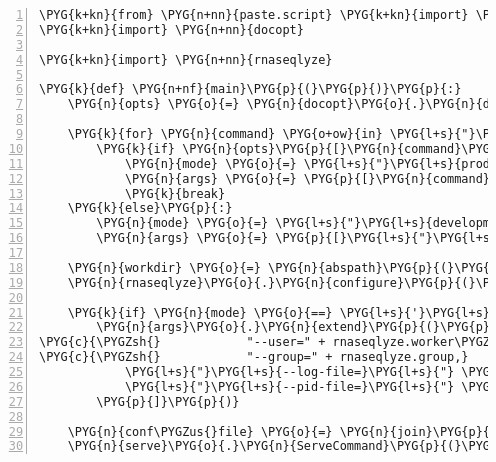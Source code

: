 \begin{Verbatim}[commandchars=\\\{\},numbers=left,firstnumber=1,stepnumber=5]
\PYG{k+kn}{from} \PYG{n+nn}{paste.script} \PYG{k+kn}{import} \PYG{n}{serve}
\PYG{k+kn}{import} \PYG{n+nn}{docopt}

\PYG{k+kn}{import} \PYG{n+nn}{rnaseqlyze}

\PYG{k}{def} \PYG{n+nf}{main}\PYG{p}{(}\PYG{p}{)}\PYG{p}{:}
    \PYG{n}{opts} \PYG{o}{=} \PYG{n}{docopt}\PYG{o}{.}\PYG{n}{docopt}\PYG{p}{(}\PYG{n}{\PYGZus{}\PYGZus{}doc\PYGZus{}\PYGZus{}}\PYG{p}{)}

    \PYG{k}{for} \PYG{n}{command} \PYG{o+ow}{in} \PYG{l+s}{"}\PYG{l+s}{start\textbar{}stop\textbar{}restart}\PYG{l+s}{"}\PYG{o}{.}\PYG{n}{split}\PYG{p}{(}\PYG{l+s}{'}\PYG{l+s}{\textbar{}}\PYG{l+s}{'}\PYG{p}{)}\PYG{p}{:}
        \PYG{k}{if} \PYG{n}{opts}\PYG{p}{[}\PYG{n}{command}\PYG{p}{]}\PYG{p}{:}
            \PYG{n}{mode} \PYG{o}{=} \PYG{l+s}{"}\PYG{l+s}{production}\PYG{l+s}{"}
            \PYG{n}{args} \PYG{o}{=} \PYG{p}{[}\PYG{n}{command}\PYG{p}{,} \PYG{l+s}{"}\PYG{l+s}{--daemon}\PYG{l+s}{"}\PYG{p}{]}
            \PYG{k}{break}
    \PYG{k}{else}\PYG{p}{:}
        \PYG{n}{mode} \PYG{o}{=} \PYG{l+s}{"}\PYG{l+s}{development}\PYG{l+s}{"}
        \PYG{n}{args} \PYG{o}{=} \PYG{p}{[}\PYG{l+s}{"}\PYG{l+s}{--reload}\PYG{l+s}{"}\PYG{p}{]}

    \PYG{n}{workdir} \PYG{o}{=} \PYG{n}{abspath}\PYG{p}{(}\PYG{n}{opts}\PYG{p}{[}\PYG{l+s}{'}\PYG{l+s}{\textless{}workdir\textgreater{}}\PYG{l+s}{'}\PYG{p}{]}\PYG{p}{)}
    \PYG{n}{rnaseqlyze}\PYG{o}{.}\PYG{n}{configure}\PYG{p}{(}\PYG{n}{workdir}\PYG{p}{)}

    \PYG{k}{if} \PYG{n}{mode} \PYG{o}{==} \PYG{l+s}{'}\PYG{l+s}{production}\PYG{l+s}{'}\PYG{p}{:}
        \PYG{n}{args}\PYG{o}{.}\PYG{n}{extend}\PYG{p}{(}\PYG{p}{[}
\PYG{c}{\PYGZsh{}            "--user=" + rnaseqlyze.worker\PYGZus{}user,}
\PYG{c}{\PYGZsh{}            "--group=" + rnaseqlyze.group,}
            \PYG{l+s}{"}\PYG{l+s}{--log-file=}\PYG{l+s}{"} \PYG{o}{+} \PYG{n}{join}\PYG{p}{(}\PYG{n}{workdir}\PYG{p}{,} \PYG{l+s}{'}\PYG{l+s}{worker-daemon.log}\PYG{l+s}{'}\PYG{p}{)}\PYG{p}{,}
            \PYG{l+s}{"}\PYG{l+s}{--pid-file=}\PYG{l+s}{"} \PYG{o}{+} \PYG{n}{join}\PYG{p}{(}\PYG{n}{workdir}\PYG{p}{,} \PYG{l+s}{'}\PYG{l+s}{worker-daemon.pid}\PYG{l+s}{'}\PYG{p}{)}\PYG{p}{,}
        \PYG{p}{]}\PYG{p}{)}

    \PYG{n}{conf\PYGZus{}file} \PYG{o}{=} \PYG{n}{join}\PYG{p}{(}\PYG{n}{workdir}\PYG{p}{,} \PYG{l+s}{'}\PYG{l+s}{worker.ini}\PYG{l+s}{'}\PYG{p}{)}
    \PYG{n}{serve}\PYG{o}{.}\PYG{n}{ServeCommand}\PYG{p}{(}\PYG{l+s}{"}\PYG{l+s}{serve}\PYG{l+s}{"}\PYG{p}{)}\PYG{o}{.}\PYG{n}{run}\PYG{p}{(}\PYG{p}{[}\PYG{n}{conf\PYGZus{}file}\PYG{p}{]} \PYG{o}{+} \PYG{n}{args}\PYG{p}{)}
\end{Verbatim}


